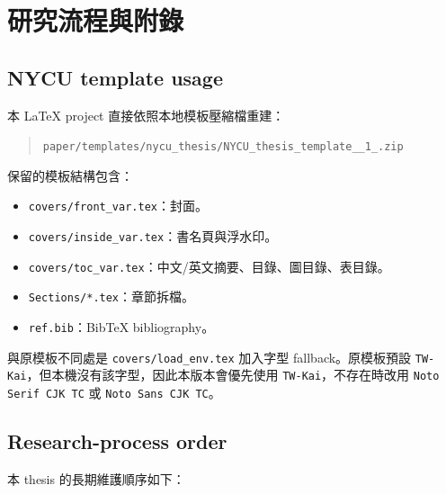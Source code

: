 \chapter{研究流程與附錄}
\label{ch:appendix}

\section{NYCU template usage}

本 LaTeX project 直接依照本地模板壓縮檔重建：

\begin{quote}
\texttt{paper/templates/nycu\_thesis/NYCU\_thesis\_template\_\_1\_.zip}
\end{quote}

保留的模板結構包含：

\begin{itemize}
  \item \texttt{covers/front\_var.tex}：封面。
  \item \texttt{covers/inside\_var.tex}：書名頁與浮水印。
  \item \texttt{covers/toc\_var.tex}：中文/英文摘要、目錄、圖目錄、表目錄。
  \item \texttt{Sections/*.tex}：章節拆檔。
  \item \texttt{ref.bib}：BibTeX bibliography。
\end{itemize}

與原模板不同處是 \texttt{covers/load\_env.tex} 加入字型 fallback。原模板預設 \texttt{TW-Kai}，但本機沒有該字型，因此本版本會優先使用 \texttt{TW-Kai}，不存在時改用 \texttt{Noto Serif CJK TC} 或 \texttt{Noto Sans CJK TC}。

\section{Research-process order}

本 thesis 的長期維護順序如下：

